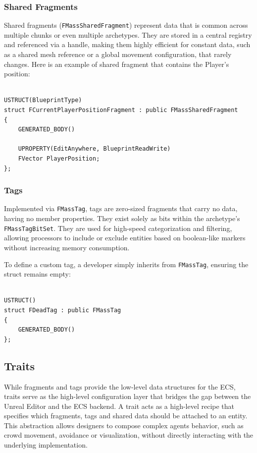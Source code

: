 \subsubsection{Shared Fragments}

Shared fragments (\texttt{FMassSharedFragment}) represent data that is common across multiple chunks or even multiple archetypes. They are stored in a central registry and referenced via a handle, making them highly efficient for constant data, such as a shared mesh reference or a global movement configuration, that rarely changes. Here is an example of shared fragment that contains the Player’s position:

\begin{lstlisting}

USTRUCT(BlueprintType)
struct FCurrentPlayerPositionFragment : public FMassSharedFragment
{
    GENERATED_BODY()

    UPROPERTY(EditAnywhere, BlueprintReadWrite)
    FVector PlayerPosition;
};

\end{lstlisting}

\subsubsection{Tags}

Implemented via \texttt{FMassTag}, tags are zero-sized fragments that carry no data, having no member properties. They exist solely as bits within the archetype's \texttt{FMassTagBitSet}. They are used for high-speed categorization and filtering, allowing processors to include or exclude entities based on boolean-like markers without increasing memory consumption. 

To define a custom tag, a developer simply inherits from \texttt{FMassTag}, ensuring the struct remains empty:

\begin{lstlisting}

USTRUCT()
struct FDeadTag : public FMassTag
{
    GENERATED_BODY()
};

\end{lstlisting}

\subsection{Traits}

While fragments and tags provide the low-level data structures for the ECS, traits serve as the high-level configuration layer that bridges the gap between the Unreal Editor and the ECS backend. A trait acts as a high-level recipe that specifies which fragments, tags and shared data should be attached to an entity. This abstraction allows designers to compose complex agents behavior, such as crowd movement, avoidance or visualization, without directly interacting with the underlying implementation.

